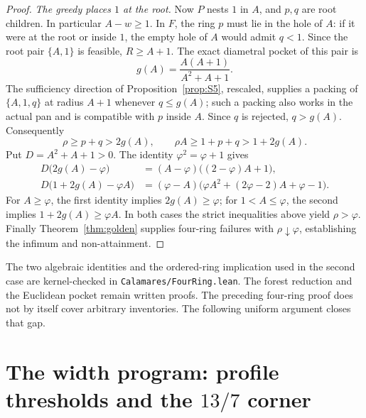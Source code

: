 \documentclass[11pt]{article}
\theoremstyle{definition}
\begin{document}
\begin{proof}
\emph{The greedy places $1$ at the root.} Now $P$ nests $1$ in
$A$, and $p,q$ are root children. In particular $A-w\ge1$.
In $F$, the ring $p$ must lie in the hole of $A$: if it were at the
root or inside $1$, the empty hole of $A$ would admit $q<1$.
Since the root pair $\{A,1\}$ is feasible, $R\ge A+1$. The exact
diametral pocket of this pair is
\[
 g(A)=\frac{A(A+1)}{A^2+A+1}.
\]
The sufficiency direction of Proposition~\ref{prop:S5}, rescaled,
supplies a packing of
$\{A,1,q\}$ at radius $A+1$ whenever $q\le g(A)$; such a packing
also works in the actual pan and is compatible with $p$ inside $A$.
Since $q$ is rejected, $q>g(A)$. Consequently
\[
 \rho\ge p+q>2g(A),\qquad
 \rho A\ge1+p+q>1+2g(A).
\]
Put $D=A^2+A+1>0$. The identity $\varphi^2=\varphi+1$ gives
\begin{align*}
 D\bigl(2g(A)-\varphi\bigr)
  &=(A-\varphi)\bigl((2-\varphi)A+1\bigr),\\
 D\bigl(1+2g(A)-\varphi A\bigr)
  &=(\varphi-A)\bigl(\varphi A^2+(2\varphi-2)A+\varphi-1\bigr).
\end{align*}
For $A\ge\varphi$, the first identity implies $2g(A)\ge\varphi$;
for $1<A\le\varphi$, the second implies $1+2g(A)\ge\varphi A$.
In both cases the strict inequalities above yield $\rho>\varphi$.
Finally Theorem~\ref{thm:golden} supplies four-ring failures with
$\rho\downarrow\varphi$, establishing the infimum and non-attainment.
\end{proof}

The two algebraic identities and the ordered-ring implication used in
the second case are kernel-checked in \texttt{Calamares/FourRing.lean}.
The forest reduction and the Euclidean pocket remain written proofs.
The preceding four-ring proof does not by itself cover arbitrary
inventories. The following uniform argument closes that gap.

\clearpage


\section{The width program: profile thresholds and the \texorpdfstring{$13/7$}{13/7} corner}
\label{sec:width}
\end{document}
